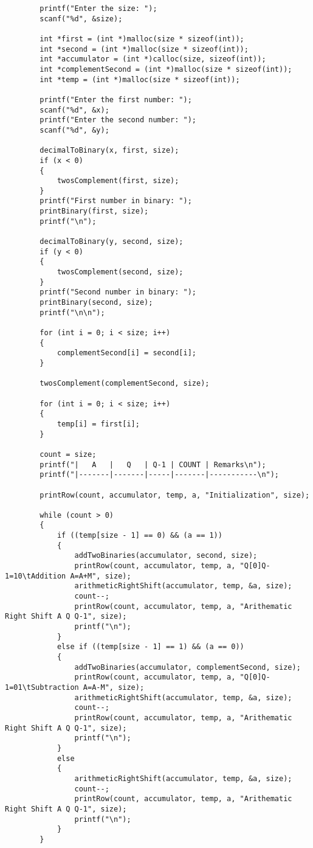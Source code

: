 \documentclass[a4paper,12pt]{article}
\begin{document}
\begin{verbatim}
        printf("Enter the size: ");
        scanf("%d", &size);
    
        int *first = (int *)malloc(size * sizeof(int));
        int *second = (int *)malloc(size * sizeof(int));
        int *accumulator = (int *)calloc(size, sizeof(int));
        int *complementSecond = (int *)malloc(size * sizeof(int));
        int *temp = (int *)malloc(size * sizeof(int));
    
        printf("Enter the first number: ");
        scanf("%d", &x);
        printf("Enter the second number: ");
        scanf("%d", &y);
    
        decimalToBinary(x, first, size);
        if (x < 0)
        {
            twosComplement(first, size);
        }
        printf("First number in binary: ");
        printBinary(first, size);
        printf("\n");
    
        decimalToBinary(y, second, size);
        if (y < 0)
        {
            twosComplement(second, size);
        }
        printf("Second number in binary: ");
        printBinary(second, size);
        printf("\n\n");
    
        for (int i = 0; i < size; i++)
        {
            complementSecond[i] = second[i];
        }
    
        twosComplement(complementSecond, size);
    
        for (int i = 0; i < size; i++)
        {
            temp[i] = first[i];
        }
    
        count = size;
        printf("|   A   |   Q   | Q-1 | COUNT | Remarks\n");
        printf("|-------|-------|-----|-------|-----------\n");
    
        printRow(count, accumulator, temp, a, "Initialization", size);
    
        while (count > 0)
        {
            if ((temp[size - 1] == 0) && (a == 1))
            {
                addTwoBinaries(accumulator, second, size);
                printRow(count, accumulator, temp, a, "Q[0]Q-1=10\tAddition A=A+M", size);
                arithmeticRightShift(accumulator, temp, &a, size);
                count--;
                printRow(count, accumulator, temp, a, "Arithematic Right Shift A Q Q-1", size);
                printf("\n");
            }
            else if ((temp[size - 1] == 1) && (a == 0))
            {
                addTwoBinaries(accumulator, complementSecond, size);
                printRow(count, accumulator, temp, a, "Q[0]Q-1=01\tSubtraction A=A-M", size);
                arithmeticRightShift(accumulator, temp, &a, size);
                count--;
                printRow(count, accumulator, temp, a, "Arithematic Right Shift A Q Q-1", size);
                printf("\n");
            }
            else
            {
                arithmeticRightShift(accumulator, temp, &a, size);
                count--;
                printRow(count, accumulator, temp, a, "Arithematic Right Shift A Q Q-1", size);
                printf("\n");
            }
        }
    

\end{verbatim}
\end{document}
